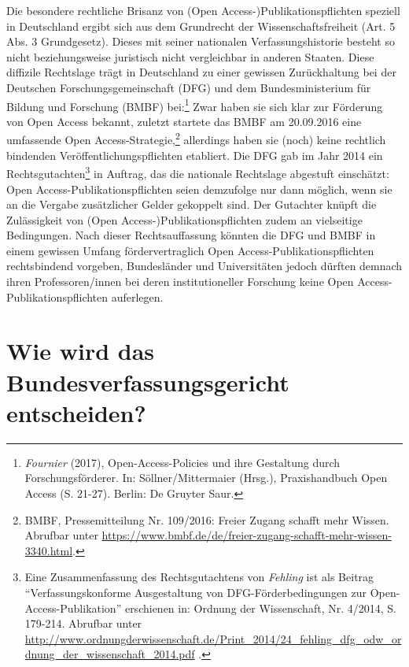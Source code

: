 \documentclass[a4paper,
fontsize=11pt,
oneside,
numbers=noperiodatend,
parskip=half-,
bibliography=totoc,
final
]{scrartcl}
\begin{document}
Die besondere rechtliche Brisanz von (Open Access-)Publikationspflichten
speziell in Deutschland ergibt sich aus dem Grundrecht der
Wissenschaftsfreiheit (Art. 5 Abs. 3 Grundgesetz). Dieses mit seiner
nationalen Verfassungshistorie besteht so nicht beziehungsweise
juristisch nicht vergleichbar in anderen Staaten. Diese diffizile
Rechtslage trägt in Deutschland zu einer gewissen Zurückhaltung bei der
Deutschen Forschungsgemeinschaft (DFG) und dem Bundesministerium für
Bildung und Forschung (BMBF) bei:\footnote{\emph{Fournier} (2017),
  Open-Access-Policies und ihre Gestaltung durch Forschungsförderer. In:
  Söllner/Mittermaier (Hrsg.), Praxishandbuch Open Access (S. 21-27).
  Berlin: De Gruyter Saur.} Zwar haben sie sich klar zur Förderung von
Open Access bekannt, zuletzt startete das BMBF am 20.09.2016 eine
umfassende Open Access-Strategie,\footnote{BMBF, Pressemitteilung Nr.
  109/2016: Freier Zugang schafft mehr Wissen. Abrufbar unter
  \url{https://www.bmbf.de/de/freier-zugang-schafft-mehr-wissen-3340.html}.}
allerdings haben sie (noch) keine rechtlich bindenden
Veröffentlichungspflichten etabliert. Die DFG gab im Jahr 2014 ein
Rechtsgutachten\footnote{Eine Zusammenfassung des Rechtsgutachtens von
  \emph{Fehling} ist als Beitrag \enquote{Verfassungskonforme
  Ausgestaltung von DFG-Förderbedingungen zur Open-Access-Publikation}
  erschienen in: Ordnung der Wissenschaft, Nr. 4/2014, S. 179-214.
  Abrufbar unter
  \url{http://www.ordnungderwissenschaft.de/Print_2014/24_fehling_dfg_odw_ordnung_der_wissenschaft_2014.pdf}
  .} in Auftrag, das die nationale Rechtslage abgestuft einschätzt: Open
Access-Publikationspflichten seien demzufolge nur dann möglich, wenn sie
an die Vergabe zusätzlicher Gelder gekoppelt sind. Der Gutachter knüpft
die Zulässigkeit von (Open Access-)Publikationspflichten zudem an
vielseitige Bedingungen. Nach dieser Rechtsauffassung könnten die DFG
und BMBF in einem gewissen Umfang fördervertraglich Open
Access-Publikationspflichten rechtsbindend vorgeben, Bundesländer und
Universitäten jedoch dürften demnach ihren Professoren/innen bei deren
institutioneller Forschung keine Open Access-Publikationspflichten
auferlegen.

\hypertarget{wie-wird-das-bundesverfassungsgericht-entscheiden}{%
\section*{Wie wird das Bundesverfassungsgericht
entscheiden?}\label{wie-wird-das-bundesverfassungsgericht-entscheiden}}
\end{document}
